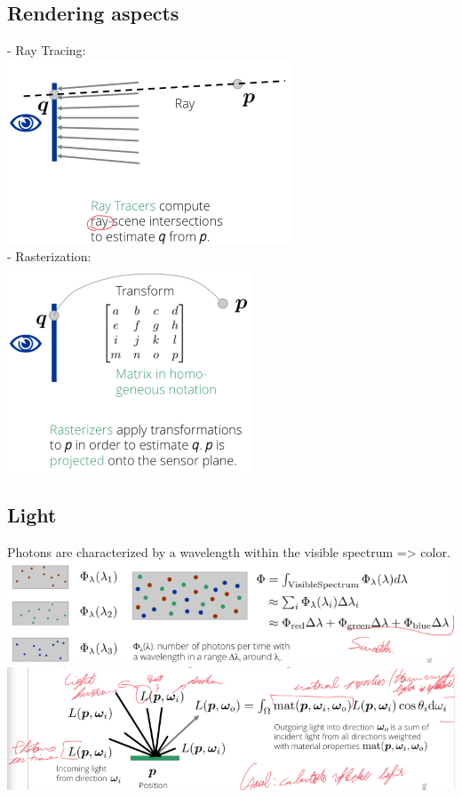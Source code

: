 \documentclass{article}
\begin{document}
\subsection{Rendering aspects}
- Ray Tracing: \\
\includegraphics{image4.png}\\
- Rasterization: \\
\includegraphics{image5.png}


\subsection{Light}
Photons are characterized by a wavelength within the visible spectrum => color.\\

\includegraphics{image2.png}
\includegraphics{image3.png}
\end{document}
